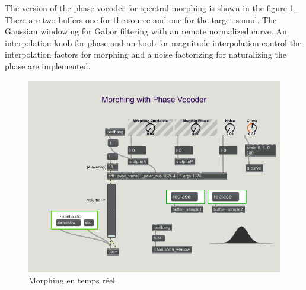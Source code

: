 \noindent\begin{minipage}{\textwidth}

\end{minipage}

The version of the phase vocoder for spectral morphing is shown in the figure \ref{Morphing}. There are two buffers one for the source and one for the target sound. The Gaussian windowing for Gabor filtering with an remote normalized curve. An interpolation knob for phase and an knob for magnitude interpolation control the interpolation factors for morphing and a noise factorizing for naturalizing the phase are implemented.

    \begin{figure}
        \centering
        \includegraphics[width = \textwidth]{Graphs/SoundMorphing.png}
        \caption{Morphing en temps réel}
        \label{Morphing}
    \end{figure}